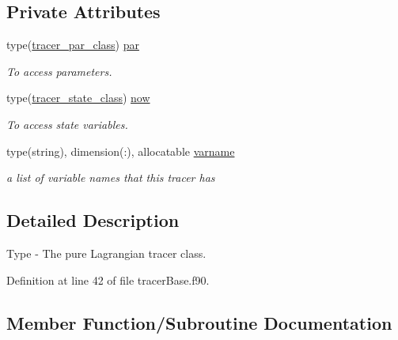 \subsection*{Private Attributes}
\begin{DoxyCompactItemize}
\item 
type(\mbox{\hyperlink{structtracerbase__mod_1_1tracer__par__class}{tracer\+\_\+par\+\_\+class}}) \mbox{\hyperlink{structtracerbase__mod_1_1tracer__class_aca04297200aad39fd04e31b630d9ca50}{par}}
\begin{DoxyCompactList}\small\item\em To access parameters. \end{DoxyCompactList}\item 
type(\mbox{\hyperlink{structtracerbase__mod_1_1tracer__state__class}{tracer\+\_\+state\+\_\+class}}) \mbox{\hyperlink{structtracerbase__mod_1_1tracer__class_ad1a1e2f727ad281e2562952d6ba94526}{now}}
\begin{DoxyCompactList}\small\item\em To access state variables. \end{DoxyCompactList}\item 
type(string), dimension(\+:), allocatable \mbox{\hyperlink{structtracerbase__mod_1_1tracer__class_a1e2b7783171ffa22fa36b8d74063afff}{varname}}
\begin{DoxyCompactList}\small\item\em a list of variable names that this tracer has \end{DoxyCompactList}\end{DoxyCompactItemize}


\subsection{Detailed Description}
Type -\/ The pure Lagrangian tracer class. 

Definition at line 42 of file tracer\+Base.\+f90.



\subsection{Member Function/\+Subroutine Documentation}
\mbox{\label{structtracerbase__mod_1_1tracer__class_a5458a1e53360bfcdf51c9a677caab112}} 
